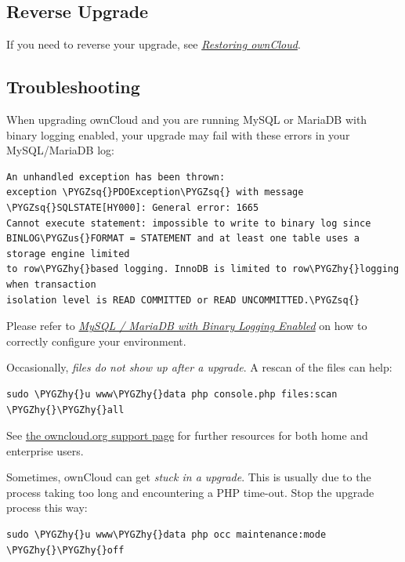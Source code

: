 \documentclass[letterpaper,10pt,english]{sphinxmanual}
\def\PYGZus{\char`\_}
\def\PYGZhy{\char`\-}
\def\PYGZsq{\char`\'}
\begin{document}
\subsection{Reverse Upgrade}
\label{maintenance/upgrade:reverse-upgrade}
If you need to reverse your upgrade, see {\hyperref[maintenance/restore::doc]{\emph{Restoring ownCloud}}}.


\subsection{Troubleshooting}
\label{maintenance/upgrade:troubleshooting}
When upgrading ownCloud and you are running MySQL or MariaDB with binary
logging enabled, your upgrade may fail with these errors in your MySQL/MariaDB log:

\begin{Verbatim}[commandchars=\\\{\}]
An unhandled exception has been thrown:
exception \PYGZsq{}PDOException\PYGZsq{} with message \PYGZsq{}SQLSTATE[HY000]: General error: 1665
Cannot execute statement: impossible to write to binary log since
BINLOG\PYGZus{}FORMAT = STATEMENT and at least one table uses a storage engine limited
to row\PYGZhy{}based logging. InnoDB is limited to row\PYGZhy{}logging when transaction
isolation level is READ COMMITTED or READ UNCOMMITTED.\PYGZsq{}
\end{Verbatim}

Please refer to {\hyperref[configuration_database/linux_database_configuration:db-binlog-label]{\emph{MySQL / MariaDB with Binary Logging Enabled}}} on how to correctly configure your
environment.

Occasionally, \emph{files do not show up after a upgrade}. A rescan of the files can
help:

\begin{Verbatim}[commandchars=\\\{\}]
sudo \PYGZhy{}u www\PYGZhy{}data php console.php files:scan \PYGZhy{}\PYGZhy{}all
\end{Verbatim}

See \href{https://owncloud.org/support}{the owncloud.org support page} for further
resources for both home and enterprise users.

Sometimes, ownCloud can get \emph{stuck in a upgrade}. This is usually due to the
process taking too long and encountering a PHP time-out. Stop the upgrade
process this way:

\begin{Verbatim}[commandchars=\\\{\}]
sudo \PYGZhy{}u www\PYGZhy{}data php occ maintenance:mode \PYGZhy{}\PYGZhy{}off
\end{Verbatim}
\end{document}
